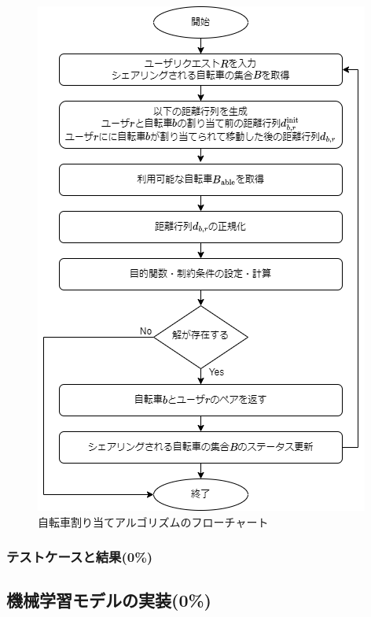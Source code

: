           \begin{figure}[htbp]
            \centering
            \includegraphics[scale=0.55]
            {figures/algorithmImplementation.png}
            \caption{自転車割り当てアルゴリズムのフローチャート}
            \label{fig:自転車割り当てアルゴリズムのフローチャート}
          \end{figure}

      \subsubsection{テストケースと結果(0\%)}
        \label{sec:テストケースと結果}
          \par  
  
  \subsection{機械学習モデルの実装(0\%)}
    \label{sec:機械学習モデルの実装}
      \par 
      
